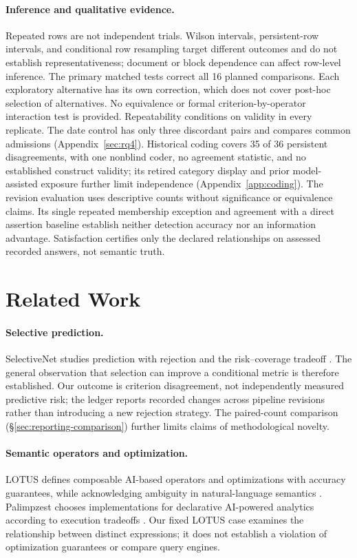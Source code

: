 \documentclass[11pt]{article}
\begin{document}
\paragraph{Inference and qualitative evidence.}
Repeated rows are not independent trials. Wilson intervals, persistent-row
intervals, and conditional row resampling target different outcomes and
do not establish representativeness; document or block dependence can affect
row-level inference. The primary matched tests correct all 16 planned
comparisons. Each exploratory alternative has its own correction, which
does not cover post-hoc selection of alternatives. No equivalence or formal
criterion-by-operator interaction test is provided. Repeatability conditions
on validity in every replicate. The date control has only three discordant
pairs and compares common admissions (Appendix~\ref{sec:rq4}). Historical
coding covers 35 of 36 persistent disagreements, with one nonblind coder,
no agreement statistic, and no established construct validity; its retired
category display and prior model-assisted exposure further limit independence
(Appendix~\ref{app:coding}).
The revision evaluation uses descriptive counts without significance or
equivalence claims. Its single repeated membership exception and agreement
with a direct assertion baseline establish neither detection accuracy nor
an information advantage. Satisfaction certifies only the declared
relationships on assessed recorded answers, not semantic truth.

\section{Related Work}

\paragraph{Selective prediction.}
SelectiveNet studies prediction with rejection and the risk--coverage
tradeoff \cite{selectivenet}. The general observation that selection can
improve a conditional metric is therefore established. Our outcome is
criterion disagreement, not independently measured predictive risk; the
ledger reports recorded changes across pipeline revisions rather than
introducing a new rejection strategy. The paired-count comparison
(\S\ref{sec:reporting-comparison}) further limits claims of methodological
novelty.

\paragraph{Semantic operators and optimization.}
LOTUS defines composable AI-based operators and optimizations with accuracy
guarantees, while acknowledging ambiguity in natural-language semantics
\cite{lotus}. Palimpzest chooses implementations for declarative AI-powered
analytics according to execution tradeoffs \cite{palimpzest}. Our fixed LOTUS
case examines the relationship between distinct expressions; it does not
establish a violation of optimization guarantees or compare query engines.
\end{document}
